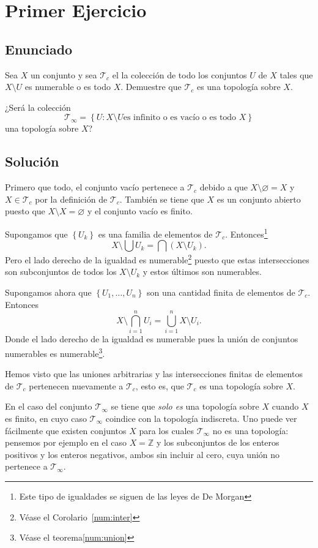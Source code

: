 \documentclass[mid,fleqn,final,oneside]{tareas}
\begin{document}
\chapter{Primer Ejercicio}
\reversemarginpar{}
\vspace{-.1em}
\section*{Enunciado}
Sea $X$ un conjunto y sea $\mathcal{T}_c$ el la
colección de todo los conjuntos $U$ de $X$ tales que
$X\setminus U$ es numerable o es todo $X$. Demuestre
que $\mathcal{T}_c$ es una topología sobre $X$.

¿Será la colección
\[
	\mathcal{T}_\infty = \left\{ U : X\setminus U
	\text{es infinito o es vacío o es todo $X$} \right\}
\]
una topología sobre $X$?

\section*{Solución}

Primero que todo, el conjunto vacío pertenece a $
\mathcal{T}_c $ debido a que $ X\setminus\varnothing=X
$ y $X\in \mathcal{T}_c$ por la definición de
$\mathcal{T}_c$.  También se
tiene que $ X $ es un conjunto abierto puesto que $
X\setminus X=\varnothing $ y el conjunto vacío es finito.

Supongamos que $
\left\{ U_k \right\}$ es una familia de elementos de $
\mathcal{T}_c $.  Entonces\footnote{Este tipo de igualdades se
	siguen de las leyes de De Morgan}
\[
	X\setminus\bigcup U_k= \bigcap (X\setminus U_k).
\]
Pero el lado derecho de la igualdad es numerable\footnote{Véase el Corolario~\ref{num:inter}} puesto
que estas intersecciones son subconjuntos de todos los
$ X\setminus U_k $ y estos últimos son numerables.

Supongamos ahora que $ \left\{ U_1,\dots,U_n \right\} $
son una cantidad finita de elementos de $
\mathcal{T}_c. $ Entonces
\[
	X\setminus\bigcap_{i=1}^{n}U_i =
	\bigcup_{i=1}^{n} X\setminus U_i.
\]
Donde el lado derecho de la igualdad es numerable pues
la unión de conjuntos numerables es numerable\footnote{Véase el teorema\ref{num:union}}.

Hemos visto que las uniones arbitrarias y las
intersecciones finitas de elementos de $\mathcal{T}_c$
pertenecen nuevamente a $\mathcal{T}_c$, esto es, que
$\mathcal{T}_c$ es una topología sobre $X$.

En el caso del conjunto $ \mathcal{T}_\infty $ se tiene
que \emph{solo es} una topología sobre $ X $ cuando
$X$ es finito, en cuyo caso $\mathcal{T}_\infty$
coindice con la topología indiscreta.
Uno puede ver fácilmente que existen conjuntos $X$
para los cuales $\mathcal{T}_\infty$ no es una
topología: pensemos por ejemplo en el caso
$X=\mathbb{Z}$ y los subconjuntos de los enteros
positivos y los enteros negativos, ambos sin incluir al
cero, cuya unión no pertenece a $\mathcal{T}_\infty$.
\end{document}
